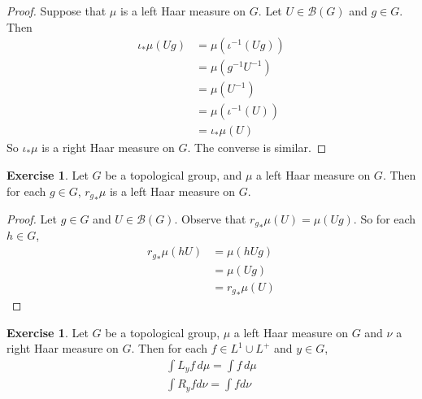 \documentclass[12pt]{amsart}
\theoremstyle{definition}
\newtheorem{ex}[definition]{Exercise}
\newcommand{\MB}{\mathcal{B}}
\newcommand{\dmu}{\, d \mu}
\newcommand{\lex}[1]{\label{ex:#1}}
\begin{document}
	\begin{proof}
		Suppose that $\mu$ is a left Haar measure on $G$. Let $U \in \MB(G)$ and $g \in G$. Then 
		\begin{align*}
			\iota_*\mu(Ug)
			& = \mu(\iota^{-1}(Ug)) \\
			&= \mu (g^{-1}U^{-1}) \\
			&= \mu (U^{-1}) \\
			&= \mu(\iota^{-1}(U)) \\
			&= \iota_*\mu(U)
		\end{align*}
		So $\iota_*\mu$ is a right Haar measure on $G$. The converse is similar.
	\end{proof}

	\begin{ex} \lex{00000} 
		Let $G$ be a topological group, and $\mu$ a left Haar measure on $G$. Then for each $g \in G$, ${r_{g}}_*\mu$ is a left Haar measure on $G$.
	\end{ex}

	\begin{proof}
		Let $g \in G$ and $U \in \MB(G)$. Observe that ${r_{g}}_*\mu(U) = \mu(Ug)$. So for each $h \in G$, 
		\begin{align*}
			{r_{g}}_*\mu(hU) 
			& = \mu(hUg) \\
			& =  \mu(Ug) \\
			& = {r_{g}}_*\mu(U)
		\end{align*}
	\end{proof}
	
	\begin{ex} \lex{00000} 
		Let $G$ be a topological group, $\mu$ a left Haar measure on $G$ and $\nu$ a right Haar measure on $G$. Then for each $f \in L^1 \cup L^+$ and $y \in G$, 
		\begin{align}
			\int L_y f \dmu = \int f \dmu \\
			\int R_y f d\nu = \int f d\nu
		\end{align}
	\end{ex}
	
\end{document}
